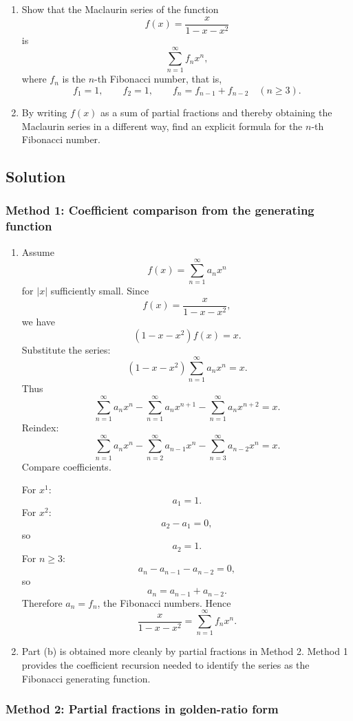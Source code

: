 \documentclass[12pt]{article}
\begin{document}
\begin{enumerate}[label=(\alph*)]
  \item Show that the Maclaurin series of the function
  \[
  f(x)=\frac{x}{1-x-x^2}
  \]
  is
  \[
  \sum_{n=1}^{\infty} f_nx^n,
  \]
  where \(f_n\) is the \(n\)-th Fibonacci number, that is,
  \[
  f_1=1,\qquad f_2=1,\qquad f_n=f_{n-1}+f_{n-2}\quad(n\ge3).
  \]

  \item By writing \(f(x)\) as a sum of partial fractions and thereby obtaining the
  Maclaurin series in a different way, find an explicit formula for the \(n\)-th
  Fibonacci number.
\end{enumerate}

\newpage
\subsection{Solution}

\subsubsection{Method 1: Coefficient comparison from the generating function}

\begin{enumerate}[label=(\alph*)]

\item
Assume
\[
f(x)=\sum_{n=1}^{\infty}a_nx^n
\]
for \(|x|\) sufficiently small. Since
\[
f(x)=\frac{x}{1-x-x^2},
\]
we have
\[
(1-x-x^2)f(x)=x.
\]
Substitute the series:
\[
(1-x-x^2)\sum_{n=1}^{\infty}a_nx^n=x.
\]
Thus
\[
\sum_{n=1}^{\infty}a_nx^n
-
\sum_{n=1}^{\infty}a_nx^{n+1}
-
\sum_{n=1}^{\infty}a_nx^{n+2}
=
x.
\]
Reindex:
\[
\sum_{n=1}^{\infty}a_nx^n
-
\sum_{n=2}^{\infty}a_{n-1}x^n
-
\sum_{n=3}^{\infty}a_{n-2}x^n
=
x.
\]
Compare coefficients.

For \(x^1\):
\[
a_1=1.
\]
For \(x^2\):
\[
a_2-a_1=0,
\]
so
\[
a_2=1.
\]
For \(n\ge3\):
\[
a_n-a_{n-1}-a_{n-2}=0,
\]
so
\[
a_n=a_{n-1}+a_{n-2}.
\]
Therefore \(a_n=f_n\), the Fibonacci numbers. Hence
\[
\boxed{
\frac{x}{1-x-x^2}
=
\sum_{n=1}^{\infty}f_nx^n.
}
\]

\item
Part (b) is obtained more cleanly by partial fractions in Method 2. Method 1 provides
the coefficient recursion needed to identify the series as the Fibonacci generating function.

\end{enumerate}

\newpage
\subsubsection{Method 2: Partial fractions in golden-ratio form}
\end{document}
